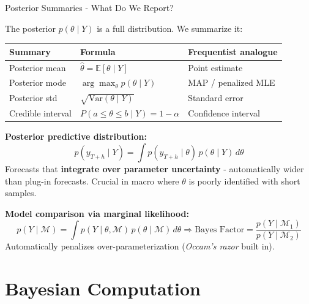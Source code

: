 \documentclass{beamer}
\begin{document}
\begin{frame}{Posterior Summaries - What Do We Report?}
\small

The posterior $p(\theta \mid Y)$ is a full distribution. We summarize it:

\medskip
\begin{tabular}{lll}
\toprule
\textbf{Summary} & \textbf{Formula} & \textbf{Frequentist analogue} \\
\midrule
Posterior mean & $\hat\theta = \mathbb{E}[\theta \mid Y]$ & Point estimate \\
Posterior mode & $\arg\max_\theta p(\theta \mid Y)$ & MAP / penalized MLE \\
Posterior std & $\sqrt{\text{Var}(\theta \mid Y)}$ & Standard error \\
Credible interval & $P(a \le \theta \le b \mid Y) = 1-\alpha$ & Confidence interval \\
\bottomrule
\end{tabular}

\medskip
\textbf{Posterior predictive distribution:}
\[
p(y_{T+h} \mid Y) = \int p(y_{T+h} \mid \theta)\, p(\theta \mid Y)\, d\theta
\]
Forecasts that \textbf{integrate over parameter uncertainty} - automatically wider than plug-in forecasts.
Crucial in macro where $\theta$ is poorly identified with short samples.

\smallskip 
\textbf{Model comparison via marginal likelihood:}
\[
p(Y \mid \mathcal{M}) = \int p(Y \mid \theta, \mathcal{M})\, p(\theta \mid \mathcal{M})\, d\theta
\Rightarrow \text{Bayes Factor} = \frac{p(Y \mid \mathcal{M}_1)}{p(Y \mid \mathcal{M}_2)}
\]
Automatically penalizes over-parameterization (\textit{Occam's razor} built in).

\end{frame}


\section{Bayesian Computation}
\end{document}
